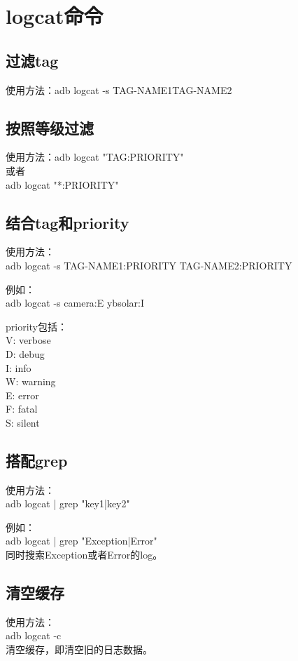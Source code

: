 ﻿
\section[logcat - Log dumper for Android] {logcat命令}
\subsection[filter tag name]{过滤tag}
使用方法：adb logcat -s \lt TAG-NAME1\gt \lt TAG-NAME2\gt

\subsection[filter by priority]{按照等级过滤}
使用方法：adb logcat "TAG:PRIORITY"\\
或者\\
adb logcat "*:PRIORITY"

\subsection[filter by tag and priority]{结合tag和priority}
使用方法：\\
adb logcat -s TAG-NAME1:PRIORITY TAG-NAME2:PRIORITY

例如：\\
adb logcat -s camera:E ybsolar:I

priority包括：\\
V: verbose\\
D: debug\\
I: info\\
W: warning\\
E: error\\
F: fatal\\
S: silent

\subsection[use grep]{搭配grep}
使用方法：\\
adb logcat | grep "key1\bs|key2"

例如：\\
adb logcat | grep "Exception\bs|Error"\\
同时搜索Exception或者Error的log。

\subsection[clear buffer]{清空缓存}
使用方法：\\
adb logcat -c\\
清空缓存，即清空旧的日志数据。

